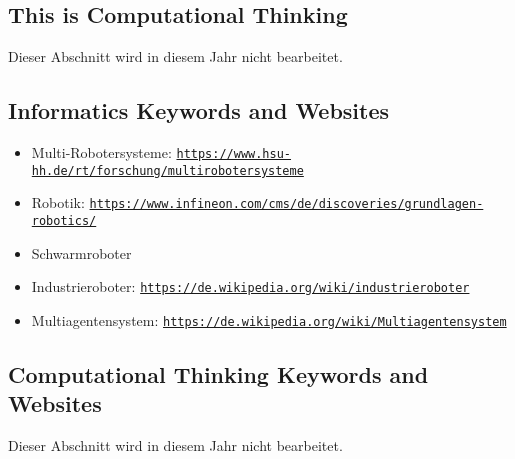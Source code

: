 \documentclass[a4paper,11pt]{report}
\newcommand{\BrochureUrlText}[1]{\texttt{#1}}
\begin{document}
\subsection*{This is Computational Thinking}

Dieser Abschnitt wird in diesem Jahr nicht bearbeitet.


\subsection*{Informatics Keywords and Websites}

\begin{itemize}
  \item Multi-Robotersysteme: \href{https://www.hsu-hh.de/rt/forschung/multirobotersysteme}{\BrochureUrlText{https://www.hsu-hh.de/rt/forschung/multirobotersysteme}}
  \item Robotik: \href{https://www.infineon.com/cms/de/discoveries/grundlagen-robotics/}{\BrochureUrlText{https://www.infineon.com/cms/de/discoveries/grundlagen-robotics/}}
  \item Schwarmroboter
  \item Industrieroboter: \href{https://de.wikipedia.org/wiki/industrieroboter}{\BrochureUrlText{https://de.wikipedia.org/wiki/industrieroboter}}
  \item Multiagentensystem: \href{https://de.wikipedia.org/wiki/Multiagentensystem}{\BrochureUrlText{https://de.wikipedia.org/wiki/Multiagentensystem}}
\end{itemize}


\subsection*{Computational Thinking Keywords and Websites}

Dieser Abschnitt wird in diesem Jahr nicht bearbeitet.
\end{document}
